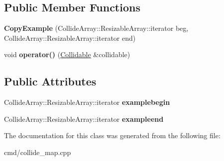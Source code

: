 \subsection*{Public Member Functions}
\begin{DoxyCompactItemize}
\item 
{\bfseries Copy\+Example} (Collide\+Array\+::\+Resizable\+Array\+::iterator beg, Collide\+Array\+::\+Resizable\+Array\+::iterator end)\hypertarget{classCopyExample_a82b8d5d0679e9f9e34af24bbf3ad8584}{}\label{classCopyExample_a82b8d5d0679e9f9e34af24bbf3ad8584}

\item 
void {\bfseries operator()} (\hyperlink{classCollidable}{Collidable} \&collidable)\hypertarget{classCopyExample_a1eb202591f40a13aa0cfc5b5c00b5700}{}\label{classCopyExample_a1eb202591f40a13aa0cfc5b5c00b5700}

\end{DoxyCompactItemize}
\subsection*{Public Attributes}
\begin{DoxyCompactItemize}
\item 
Collide\+Array\+::\+Resizable\+Array\+::iterator {\bfseries examplebegin}\hypertarget{classCopyExample_a0154eff7e8fc5c9a6cee29818a016f97}{}\label{classCopyExample_a0154eff7e8fc5c9a6cee29818a016f97}

\item 
Collide\+Array\+::\+Resizable\+Array\+::iterator {\bfseries exampleend}\hypertarget{classCopyExample_ab6c28e50722bf687639d14b48abc0b3e}{}\label{classCopyExample_ab6c28e50722bf687639d14b48abc0b3e}

\end{DoxyCompactItemize}


The documentation for this class was generated from the following file\+:\begin{DoxyCompactItemize}
\item 
cmd/collide\+\_\+map.\+cpp\end{DoxyCompactItemize}
